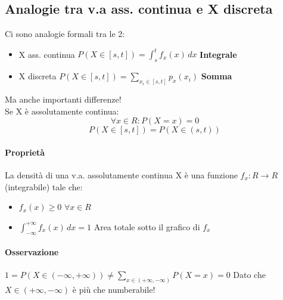 \documentclass[12pt, a4paper, openany]{book}
\begin{document}
\subsection*{Analogie tra v.a ass. continua e X discreta}
Ci sono analogie formali tra le 2: \begin{itemize}
    \item X ass. continua $P(X \in [s, t]) = \int_{s}^{t} f_x (x) \,dx$ \textbf{Integrale}
    \item X discreta $P(X \in [s, t]) = \sum_{x_i \in [s,t]}p_x (x_i)$ \textbf{Somma}
\end{itemize}
Ma anche importanti differenze!
\\ Se X è assolutamente continua:
\begin{equation*}
    \forall x \in R: P(X=x) = 0
\end{equation*}
\begin{equation*}
    P(X \in [s,t]) = P(X \in (s, t))
\end{equation*}
\paragraph*{Proprietà} La densità di una v.a. assolutamente continua X è una funzione 
$f_x : R \to R$ (integrabile) tale che: \begin{itemize}
    \item $f_x (x) \geq 0$ $\forall x \in R$
    \item $\int_{-\infty}^{+\infty} f_x (x) \,dx = 1$ Area 
    totale sotto il grafico di $f_x$
\end{itemize}
 \paragraph*{Osservazione} $1 = P(X \in (-\infty, +\infty)) 
 \neq \sum_{x \in (+\infty, -\infty)} P (X = x) = 0$ Dato che $X \in (+\infty, -\infty)$
 è più che numberabile!
\end{document}
